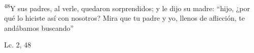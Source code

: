 \documentclass[../../rosario.tex]{subfiles}
\begin{document}
    \textsuperscript{48}Y sus padres, al verle, quedaron sorprendidos; y le dijo su madre: ``hijo, ¿por qué lo hiciste así con nosotros? Mira que tu padre
    y yo, llenos de aflicción, te andábamos buscando''
    \begin{flushright}
    Lc. 2, 48     
    \end{flushright}
\end{document}
